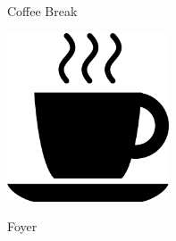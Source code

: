 \documentclass[a4paper]{article}
\begin{document}
\printGenericVSLHeader
\begin{center}
\begin{vsltext}{3cm}{3.2cm}

    Coffee Break

    \vspace{1cm}

    \includegraphics[height=5cm, keepaspectratio=true]{coffeecup.png}

    Foyer

\end{vsltext}

\end{center}
\end{document}
